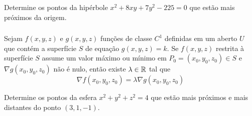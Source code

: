 \begin{frame}[label=otimizacao]
\begin{casa}
Determine os pontos da hipérbole $x^2+8xy+7y^2-225=0$ que estão mais próximos da origem.
\end{casa}
\end{frame}

%
%
%


\begin{frame}[label=otimizacao]
\frametitle{ }
\begin{teo}Sejam $f(x,y,z)$ e $g(x,y,z)$ funções de classe $C^1$ definidas em um aberto $U$ que contém a superfície $S$ de equação $g(x,y,z)=k$. Se $f(x,y,z)$ restrita à superfície $S$ assume um valor máximo ou mínimo em $P_0=(x_0,y_0,z_0)\in S$ e $\nabla g(x_0,y_0,z_0)$ não é nulo, então existe $\lambda\in \mathbb{R}$ tal que
\[\nabla f(x_0,y_0,z_0)=\lambda \nabla g(x_0,y_0,z_0)\]
\end{teo} 

\begin{exe}
Determine os pontos da esfera $x^2+y^2+z^2=4$ que estão mais próximos e mais distantes do ponto $(3,1,-1)$.
\end{exe}


\end{frame}

